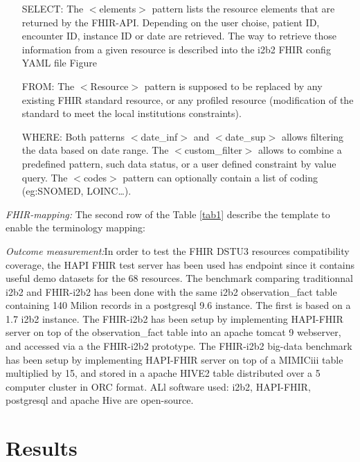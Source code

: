 \documentclass{amia}
\begin{document}
\begin{itemize}
	\item[SELECT:] The $<$elements$>$ pattern lists the resource elements that are returned by the FHIR-API. Depending on the user choise, patient ID, encounter ID, instance ID or date are retrieved. The way to retrieve those information from a given resource is described into the i2b2 FHIR config YAML file Figure 
	\item[FROM:] The $<$Resource$>$ pattern is supposed to be replaced by any existing FHIR standard resource, or any profiled resource (modification of the standard to meet the local institutions constraints). 
	\item [WHERE:] Both patterns $<$date\_inf$>$ and $<$date\_sup$>$ allows filtering the data based on date range. The $<$custom\_filter$>$ allows to combine a predefined pattern, such data status, or a user defined constraint by value query. The $<$codes$>$ pattern can optionally contain a list of coding (eg:SNOMED, LOINC\ldots).
\end{itemize}
\textit{FHIR-mapping:} The second row of the Table \ref{tab1} describe the template to enable the terminology mapping:



\textit{Outcome measurement:}In order to test the FHIR DSTU3 resources compatibility coverage, the HAPI FHIR test server has been used has endpoint since it contains useful demo datasets for the 68 resources. The benchmark comparing traditionnal i2b2 and FHIR-i2b2 has been done with the same i2b2 observation\_fact table containing 140 Milion records in a postgresql 9.6 instance. The first is based on a 1.7 i2b2 instance. The FHIR-i2b2 has been setup by implementing HAPI-FHIR server on top of the observation\_fact table into an apache tomcat 9 webserver, and accessed via a the FHIR-i2b2 prototype. The FHIR-i2b2 big-data benchmark has been setup by implementing HAPI-FHIR server on top of a MIMICiii table multiplied by 15, and stored in a apache HIVE2 table distributed over a 5 computer cluster in ORC format.
ALl software used: i2b2, HAPI-FHIR, postgresql and apache Hive are open-source.

\section*{Results}
\end{document}
